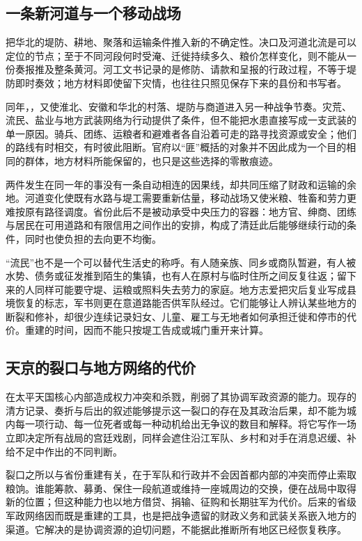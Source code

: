 \subsection{一条新河道与一个移动战场}

把华北的堤防、耕地、聚落和运输条件推入新的不确定性。决口及河道北流是可以定位的节点；至于不同河段何时受淹、迁徙持续多久、粮价怎样变化，则不能从一份奏报推及整条黄河。河工文书记录的是修防、请款和呈报的行政过程，不等于堤防即时奏效；地方材料即使留下灾情，也往往只照见保存下来的县份和书写者。

同年，，又使淮北、安徽和华北的村落、堤防与商道进入另一种战争节奏。灾荒、流民、盐业与地方武装网络为行动提供了条件，但不能把水患直接写成一支武装的单一原因。骑兵、团练、运粮者和避难者各自沿着可走的路寻找资源或安全；他们的路线有时相交，有时彼此阻断。官府以“匪”概括的对象并不因此成为一个目的相同的群体，地方材料所能保留的，也只是这些选择的零散痕迹。

两件发生在同一年的事没有一条自动相连的因果线，却共同压缩了财政和运输的余地。河道变化使既有水路与堤工需要重新估量，移动战场又使米粮、牲畜和劳力更难按原有路径调度。省份此后不是被动承受中央压力的容器：地方官、绅商、团练与居民在可用道路和有限信用之间作出的安排，构成了清廷此后能够继续行动的条件，同时也使负担的去向更不均衡。

“流民”也不是一个可以替代生活史的称呼。有人随亲族、同乡或商队暂避，有人被水势、债务或征发推到陌生的集镇，也有人在原村与临时住所之间反复往返；留下来的人同样可能要守堤、运粮或照料失去劳力的家庭。地方志爱把灾后复业写成县境恢复的标志，军书则更在意道路能否供军队经过。它们能够让人辨认某些地方的断裂和修补，却很少连续记录妇女、儿童、雇工与无地者如何承担迁徙和停市的代价。重建的时间，因而不能只按堤工告成或城门重开来计算。

\subsection{天京的裂口与地方网络的代价}

在太平天国核心内部造成权力冲突和杀戮，削弱了其协调军政资源的能力。现存的清方记录、奏折与后出的叙述能够提示这一裂口的存在及其政治后果，却不能为城内每一项行动、每一位死者或每一种动机给出无争议的数目和解释。将它写作一场立即决定所有战局的宫廷戏剧，同样会遮住沿江军队、乡村和对手在消息迟缓、补给不足中作出的不同判断。

裂口之所以与省份重建有关，在于军队和行政并不会因首都内部的冲突而停止索取粮饷。谁能筹款、募勇、保住一段航道或维持一座城周边的交换，便在战局中取得新的位置；但这种能力也以地方借贷、捐输、征购和长期驻军为代价。后来的省级军政网络因而既是重建的工具，也是把战争遗留的财政义务和武装关系嵌入地方的渠道。它解决的是协调资源的迫切问题，不能据此推断所有地区已经恢复秩序。

